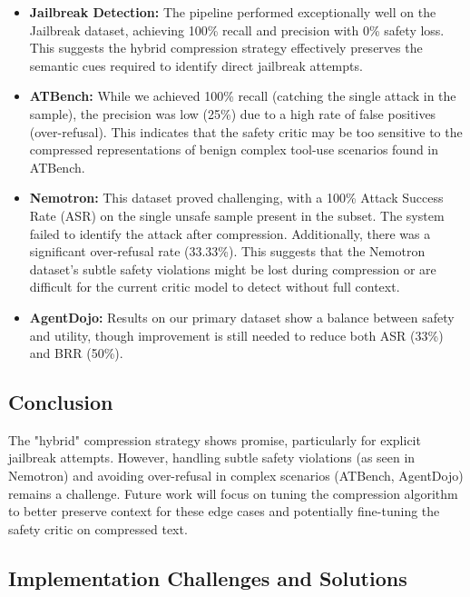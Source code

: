 \documentclass[11pt]{article}
\begin{document}
\begin{itemize}
    \item \textbf{Jailbreak Detection:} The pipeline performed exceptionally well on the Jailbreak dataset, achieving 100\% recall and precision with 0\% safety loss. This suggests the hybrid compression strategy effectively preserves the semantic cues required to identify direct jailbreak attempts.
    
    \item \textbf{ATBench:} While we achieved 100\% recall (catching the single attack in the sample), the precision was low (25\%) due to a high rate of false positives (over-refusal). This indicates that the safety critic may be too sensitive to the compressed representations of benign complex tool-use scenarios found in ATBench.
    
    \item \textbf{Nemotron:} This dataset proved challenging, with a 100\% Attack Success Rate (ASR) on the single unsafe sample present in the subset. The system failed to identify the attack after compression. Additionally, there was a significant over-refusal rate (33.33\%). This suggests that the Nemotron dataset's subtle safety violations might be lost during compression or are difficult for the current critic model to detect without full context.
    
    \item \textbf{AgentDojo:} Results on our primary dataset show a balance between safety and utility, though improvement is still needed to reduce both ASR (33\%) and BRR (50\%).
\end{itemize}

\subsection{Conclusion}
The "hybrid" compression strategy shows promise, particularly for explicit jailbreak attempts. However, handling subtle safety violations (as seen in Nemotron) and avoiding over-refusal in complex scenarios (ATBench, AgentDojo) remains a challenge. Future work will focus on tuning the compression algorithm to better preserve context for these edge cases and potentially fine-tuning the safety critic on compressed text.

\subsection{Implementation Challenges and Solutions}
\end{document}
